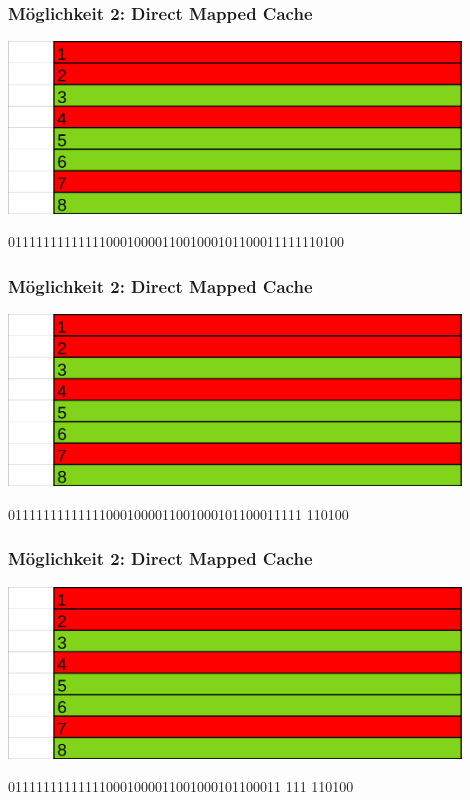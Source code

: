 \documentclass{beamer}
\begin{document}
%
\begin{frame}
\frametitle{M\"oglichkeit 2: Direct Mapped Cache}
\centerline{\includegraphics[width=12cm]{fac1.png}}
011111111111110001000011001000101100011111110100
\end{frame}

% 
%
\begin{frame}
\frametitle{M\"oglichkeit 2: Direct Mapped Cache}
\centerline{\includegraphics[width=12cm]{fac1.png}}
011111111111110001000011001000101100011111 {\color{orange}110100}
\end{frame}

\begin{frame}
\frametitle{M\"oglichkeit 2: Direct Mapped Cache}
\centerline{\includegraphics[width=12cm]{fac1.png}}
011111111111110001000011001000101100011 {\color{blue}111} {\color{orange}110100}
\end{frame}
\end{document}
